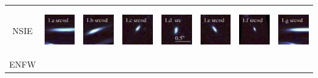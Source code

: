 \documentclass[useAMS,usenatbib]{mn2e}
\begin{document}
\begin{table}
\begin{tabular}{cccccccc}
    \multicolumn{1}{m{1cm}}{{\Large NSIE}}
    & \multicolumn{1}{m{1.7cm}}{\includegraphics[height=2.00cm,clip]{figs/nsie_img/rgb.pre_1_a_d_tri.ps}}
    & \multicolumn{1}{m{1.7cm}}{\includegraphics[height=2.00cm,clip]{figs/nsie_img/rgb.pre_1_b_d_tri.ps}}
    & \multicolumn{1}{m{1.7cm}}{\includegraphics[height=2.00cm,clip]{figs/nsie_img/rgb.pre_1_c_d_tri.ps}}
    & \multicolumn{1}{m{1.7cm}}{\includegraphics[height=2.00cm,clip]{figs/nsie_img/rgb.src_1_d.ps}}
    & \multicolumn{1}{m{1.7cm}}{\includegraphics[height=2.00cm,clip]{figs/nsie_img/rgb.pre_1_e_d_tri.ps}}
    & \multicolumn{1}{m{1.7cm}}{\includegraphics[height=2.00cm,clip]{figs/nsie_img/rgb.pre_1_f_d_tri.ps}}
    & \multicolumn{1}{m{1.7cm}}{\includegraphics[height=2.00cm,clip]{figs/nsie_img/rgb.pre_1_g_d_tri.ps}} \\
    \multicolumn{1}{m{1cm}}{{\Large ENFW}}

\end{tabular}
\end{table}
\end{document}
